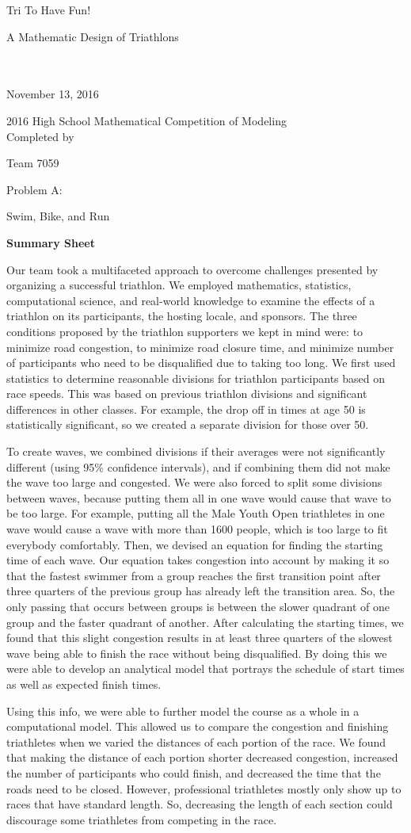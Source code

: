 \documentclass[12pt]{article}
\newcommand*{\titleGP}{\begingroup
\centering
{\Large Tri To Have Fun! \par 
\vspace{2}A Mathematic Design of Triathlons }\\
\\[\baselineskip]
November 13, 2016\par
{\large 2016 High School Mathematical Competition of Modeling}\\
Completed by \\
{\large Team 7059\par}
Problem A: \\
{\large Swim, Bike, and Run\par}
{\itshape}
\endgroup}
\begin{document}
\titleGP
\begin{flushleft}
\textbf{\Large Summary Sheet} \par{}
\vspace{2ex}
Our team took a multifaceted approach to overcome challenges presented by organizing a successful triathlon. We employed mathematics, statistics, computational science, and real-world knowledge to examine the effects of a triathlon on its participants, the hosting locale, and sponsors. The three conditions proposed by the triathlon supporters we kept in mind were: to minimize road congestion, to minimize road closure time, and minimize number of participants who need to be disqualified due to taking too long. We first used statistics to determine reasonable divisions for triathlon participants based on race speeds. This was based on previous triathlon divisions and significant differences in other classes. For example, the drop off in times at age 50 is statistically significant, so we created a separate division for those over 50. \par
To create waves, we combined divisions if their averages were not significantly different (using 95\% confidence intervals), and if combining them did not make the wave too large and congested. We were also forced to split some divisions between waves, because putting them all in one wave would cause that wave to be too large. For example, putting all the Male Youth Open triathletes in one wave would cause a wave with more than 1600 people, which is too large to fit everybody comfortably. Then, we devised an equation for finding the starting time of each wave. Our equation takes congestion into account by making it so that the fastest swimmer from a group reaches the first transition point after three quarters of the previous group has already left the transition area. So, the only passing that occurs between groups is between the slower quadrant of one group and the faster quadrant of another. After calculating the starting times, we found that this slight congestion results in at least three quarters of the slowest wave being able to finish the race without being disqualified. By doing this we were able to develop an analytical model that portrays the schedule of start times as well as expected finish times.\par{}
Using this info, we were able to further model the course as a whole in a computational model. This allowed us to compare the congestion and finishing triathletes when we varied the distances of each portion of the race. We found that making the distance of each portion shorter decreased congestion, increased the number of participants who could finish, and decreased the time that the roads need to be closed. However, professional triathletes mostly only show up to races that have standard length. So, decreasing the length of each section could discourage some triathletes from competing in the race.
\end{flushleft}
\end{document}
